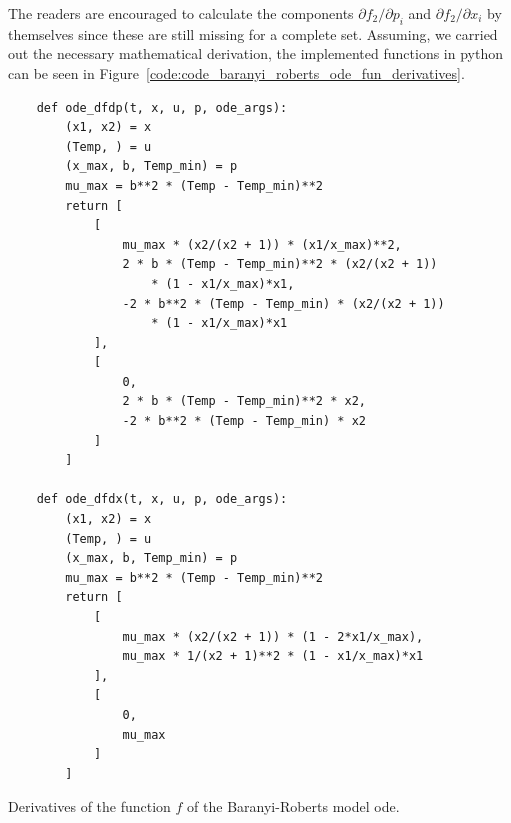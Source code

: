 \documentclass[10pt,A4paper]{article}
\begin{document}
The readers are encouraged to calculate the components $\partial f_2/\partial p_i$ and $\partial f_2/\partial x_i$ by themselves since these are still missing for a complete set.
Assuming, we carried out the necessary mathematical derivation, the implemented functions in python can be seen in Figure~\ref{code:code_baranyi_roberts_ode_fun_derivatives}.
\begin{code}[H]
    \begin{verbatim}
    def ode_dfdp(t, x, u, p, ode_args):
        (x1, x2) = x
        (Temp, ) = u
        (x_max, b, Temp_min) = p
        mu_max = b**2 * (Temp - Temp_min)**2
        return [
            [
                mu_max * (x2/(x2 + 1)) * (x1/x_max)**2,
                2 * b * (Temp - Temp_min)**2 * (x2/(x2 + 1))
                    * (1 - x1/x_max)*x1,
                -2 * b**2 * (Temp - Temp_min) * (x2/(x2 + 1))
                    * (1 - x1/x_max)*x1
            ],
            [
                0,
                2 * b * (Temp - Temp_min)**2 * x2,
                -2 * b**2 * (Temp - Temp_min) * x2
            ]  
        ]

    def ode_dfdx(t, x, u, p, ode_args):
        (x1, x2) = x
        (Temp, ) = u
        (x_max, b, Temp_min) = p
        mu_max = b**2 * (Temp - Temp_min)**2
        return [
            [
                mu_max * (x2/(x2 + 1)) * (1 - 2*x1/x_max),
                mu_max * 1/(x2 + 1)**2 * (1 - x1/x_max)*x1
            ], 
            [
                0,
                mu_max
            ]
        ]
    \end{verbatim}
    \caption{Derivatives of the function $f$ of the Baranyi-Roberts model \ac{ode}.}
    \label{code:code_baranyi_roberts_ode_fun_derivatives}
\end{code}
%
\end{document}
